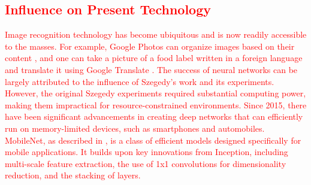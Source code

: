 \documentclass{article}
\begin{document}
\textcolor{red}{
\subsection{Influence on Present Technology}
Image recognition technology has become ubiquitous and is now readily accessible to the masses. For example, Google Photos can organize images based on their content \cite{google_photos_updates_2023}, and one can take a picture of a food label written in a foreign language and translate it using Google Translate \cite{google_translate_support_2024}. The success of neural networks can be largely attributed to the influence of Szegedy's work and its experiments. However, the original Szegedy experiments required substantial computing power, making them impractical for resource-constrained environments. Since 2015, there have been significant advancements in creating deep networks that can efficiently run on memory-limited devices, such as smartphones and automobiles. MobileNet, as described in \cite{howard2017mobilenets}, is a class of efficient models designed specifically for mobile applications. It builds upon key innovations from Inception, including multi-scale feature extraction, the use of 1x1 convolutions for dimensionality reduction, and the stacking of layers.}



\end{document}
